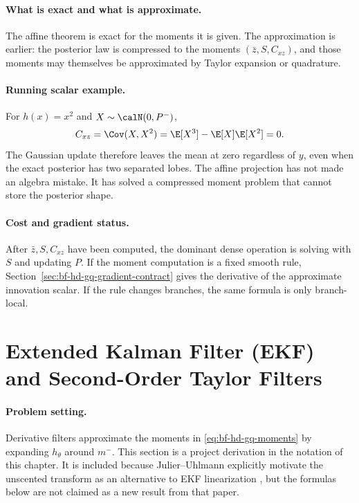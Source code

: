 \paragraph{What is exact and what is approximate.}
The affine theorem is exact for the moments it is given.  The approximation is
earlier: the posterior law is compressed to the moments
\((\bar z,S,C_{xz})\), and those moments may themselves be approximated by
Taylor expansion or quadrature.

\paragraph{Running scalar example.}
For \(h(x)=x^2\) and \(X\sim\calN(0,P^-)\),
\[
  C_{xz}=\Cov(X,X^2)=\E[X^3]-\E[X]\E[X^2]=0.
\]
The Gaussian update therefore leaves the mean at zero regardless of \(y\), even
when the exact posterior has two separated lobes.  The affine projection has not
made an algebra mistake.  It has solved a compressed moment problem that cannot
store the posterior shape.

\paragraph{Cost and gradient status.}
After \(\bar z,S,C_{xz}\) have been computed, the dominant dense operation is
solving with \(S\) and updating \(P\).  If the moment computation is a fixed
smooth rule, Section~\ref{sec:bf-hd-gq-gradient-contract} gives the derivative
of the approximate innovation scalar.  If the rule changes branches, the same
formula is only branch-local.

\section{Extended Kalman Filter (EKF) and Second-Order Taylor Filters}
\label{sec:bf-hd-derivative-filters}

\paragraph{Problem setting.}
Derivative filters approximate the moments in
\eqref{eq:bf-hd-gq-moments} by expanding \(h_\theta\) around \(m^-\).  This
section is a project derivation in the notation of this chapter.  It is included
because Julier--Uhlmann explicitly motivate the unscented transform as an
alternative to EKF linearization \citep{julier1997new}, but the formulas below
are not claimed as a new result from that paper.

